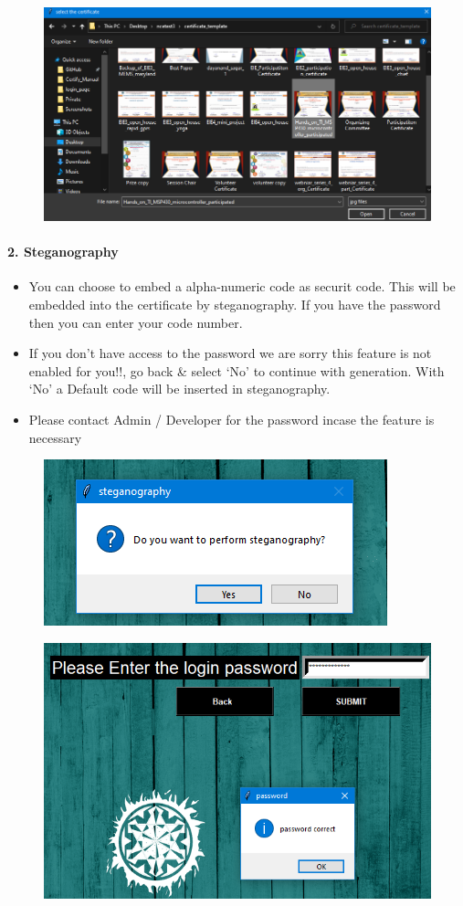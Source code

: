 \begin{figure}[H]
	\centering
	\includegraphics[width=0.85\linewidth]{"images/generation_qr_nqr/Screenshot (30)"}
	\label{fig:screenshot-30}
\end{figure}

\newpage
\paragraph{2. Steganography}

\begin{itemize}
	\item You can choose to embed a alpha-numeric code as securit code. This will be embedded into the certificate by steganography. If you have the password then you can enter your code number.
	\item If you don't have access to the password we are sorry this feature is not enabled for you!!, go back \& select `No' to continue with generation. With `No' a Default code will be inserted in steganography.
	\item Please contact Admin / Developer for the password incase the feature is necessary
\end{itemize}

\begin{figure}[H]
	\centering
	\includegraphics[width=0.5\linewidth]{"images/generation_qr_nqr/Screenshot (31)"}
	\label{fig:screenshot-31}
\end{figure}

\begin{figure}[H]
	\centering
	\includegraphics[width=0.65\linewidth]{"images/generation_qr_nqr/Screenshot (33)"}
	\label{fig:screenshot-33}
\end{figure}

